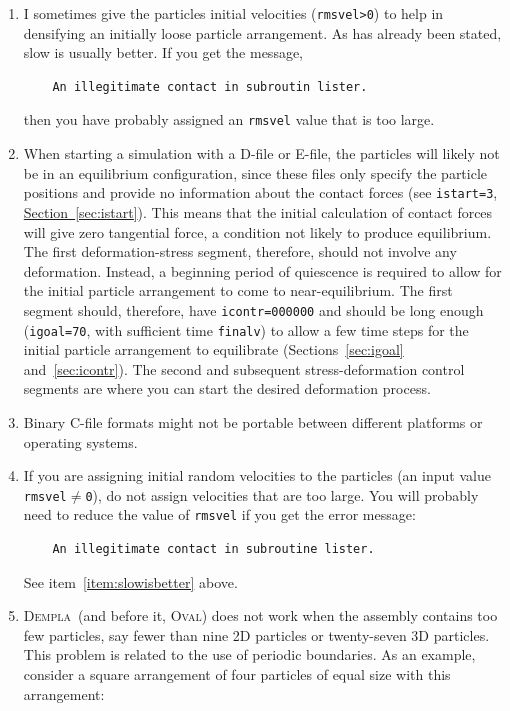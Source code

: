 \documentclass[letterpaper,11pt]{article}
\newcommand{\Oval}{\textsc{Oval}}
\newcommand{\Dempla}{\textsc{Dempla}}
\begin{document}
\begin{enumerate}
%
\item
I sometimes give the particles initial velocities (\texttt{rmsvel>0})
to help in densifying an initially loose particle arrangement.
As has already been stated, slow is usually better.
If you get the message,
\begin{verbatim}
    An illegitimate contact in subroutin lister.
\end{verbatim}
then you have probably assigned an \texttt{rmsvel} value that is
too large.
\item
When starting a simulation with a D-file or E-file, the
particles will likely not be in an equilibrium configuration,
since these files only specify the particle positions and provide
no information about the contact forces
(see \texttt{istart=3},
\hyperref[sec:istart]{Section~\ref*{sec:istart}}).  
This means that the
initial calculation of contact forces will give zero tangential force,
a condition not likely to produce equilibrium.
The first deformation-stress segment, therefore, should
not involve any deformation.
Instead,
a beginning period of quiescence is required to allow for the initial particle
arrangement to come to near-equilibrium.
The first segment should, therefore, have
\texttt{icontr=000000} and should be long enough
(\texttt{igoal=70}, with sufficient time \texttt{finalv})
to allow a few time steps for the initial particle arrangement
to equilibrate (Sections~\ref{sec:igoal} and~\ref{sec:icontr}).
The second and subsequent stress-deformation control segments are where you
can start the desired deformation process.
\item
Binary C-file formats might not be portable 
between different platforms or operating systems.
\item
If you are assigning initial random velocities to the particles
(an input value \mbox{\texttt{rmsvel}$\neq$\texttt{0}}), do not
assign velocities that are too large.
You will probably need to reduce the value of \texttt{rmsvel}
if you get the error message:
\begin{verbatim}
    An illegitimate contact in subroutine lister.
\end{verbatim}
See item~\ref{item:slowisbetter} above.
\item
\Dempla\ (and before it, \Oval) does not work when the assembly contains too few particles,
say fewer than nine 2D particles or twenty-seven 3D particles.
This problem is related to the use of periodic boundaries.
As an example, consider a square arrangement of four particles of equal 
size with this arrangement:
%
\begin{center}

\end{center}
\end{enumerate}
\end{document}
